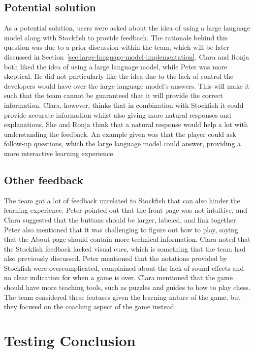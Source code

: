 \subsection{Potential solution}\label{subsec:potential-solution}

As a potential solution, users were asked about the idea of using a large language model along with Stockfish to provide
feedback.
The rationale behind this question was due to a prior discussion within the team, which will be later discussed in
Section~\ref{sec:large-language-model-implementation}.
Clara and Ronja both liked the idea of using a large language model, while Peter was more skeptical.
He did not particularly like the idea due to the lack of control the developers would have over the large language
model's answers.
This will make it such that the team cannot be guaranteed that it will provide the correct information.
Clara, however, thinks that in combination with Stockfish it could provide accurate information whilst also giving more
natural responses and explanations.
She and Ronja think that a natural response would help a lot with understanding the feedback.
An example given was that the player could ask follow-up questions, which the large language model could answer,
providing a more interactive learning experience.

\subsection{Other feedback}\label{subsec:other-feedback}

The team got a lot of feedback unrelated to Stockfish that can also hinder the learning experience.
Peter pointed out that the front page was not intuitive, and Clara suggested that the buttons should be larger, labeled,
and link together.
Peter also mentioned that it was challenging to figure out how to play, saying that the About page should contain
more technical information.
Clara noted that the Stockfish feedback lacked visual cues, which is something that the team had also previously
discussed.
Peter mentioned that the notations provided by Stockfish were overcomplicated, complained about the lack of sound
effects and no clear indication for when a game is over.
Clara mentioned that the game should have more teaching tools, such as puzzles and guides to how to play chess.
The team considered these features given the learning nature of the game, but they focused on the coaching aspect of the
game instead.

\section{Testing Conclusion}\label{sec:tests-conclusion}

